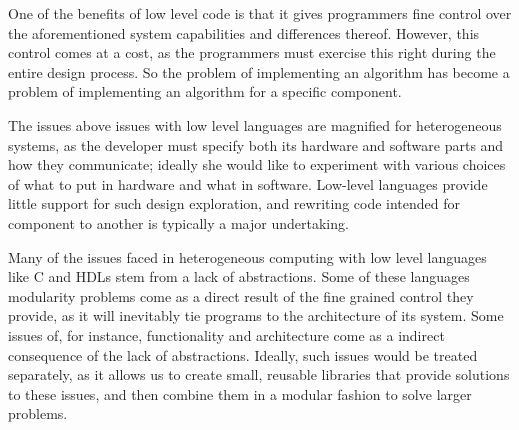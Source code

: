 \documentclass[../main.tex]{subfiles}
\begin{document}

One of the benefits of low level code is that it gives programmers fine control over the aforementioned system capabilities and differences thereof. However, this control comes at a cost, as the programmers must exercise this right during the entire design process. So the problem of implementing an algorithm has become a problem of implementing an algorithm for a specific component.

The issues above issues with low level languages are magnified for heterogeneous systems, as the developer must specify both its hardware and software parts and how they communicate; ideally she would like to experiment with various choices of what to put in hardware and what in software. Low-level languages provide little support for such design exploration, and rewriting code intended for component to another is typically a major undertaking.

Many of the issues faced in heterogeneous computing with low level languages like C and HDLs stem from a lack of abstractions. Some of these languages modularity problems come as a direct result of the fine grained control they provide, as it will inevitably tie programs to the architecture of its system. Some issues of, for instance, functionality and architecture come as a indirect consequence of the lack of abstractions. Ideally, such issues would be treated separately, as it allows us to create small, reusable libraries that provide solutions to these issues, and then combine them in a modular fashion to solve larger problems.

\end{document}
